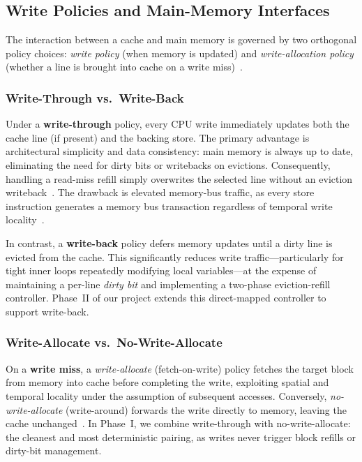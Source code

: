 %

\subsection{Write Policies and Main-Memory Interfaces}
\label{sec:litreview-m3}

The interaction between a cache and main memory is governed by two
orthogonal policy choices: \emph{write policy} (when memory is updated) and
\emph{write-allocation policy} (whether a line is brought into cache on a
write miss)~\cite{smith1982, hennessy2017}.

\subsubsection{Write-Through vs.\ Write-Back}
Under a \textbf{write-through} policy, every CPU write immediately updates
both the cache line (if present) and the backing store. The primary
advantage is architectural simplicity and data consistency: main memory is
always up to date, eliminating the need for dirty bits or writebacks on
evictions. Consequently, handling a read-miss refill simply overwrites the
selected line without an eviction writeback~\cite{jouppi1990}. The drawback
is elevated memory-bus traffic, as every store instruction generates a memory
bus transaction regardless of temporal write locality~\cite{patterson2020}.

In contrast, a \textbf{write-back} policy defers memory updates until a
dirty line is evicted from the cache. This significantly reduces write
traffic—particularly for tight inner loops repeatedly modifying local
variables—at the expense of maintaining a per-line \emph{dirty bit} and
implementing a two-phase eviction-refill controller. Phase~II of our project
extends this direct-mapped controller to support write-back.

\subsubsection{Write-Allocate vs.\ No-Write-Allocate}
On a \textbf{write miss}, a \emph{write-allocate} (fetch-on-write) policy
fetches the target block from memory into cache before completing the write,
exploiting spatial and temporal locality under the assumption of subsequent
accesses. Conversely, \emph{no-write-allocate} (write-around) forwards the
write directly to memory, leaving the cache unchanged~\cite{hennessy2017, hill1989}.
In Phase~I, we combine write-through with no-write-allocate: the cleanest and
most deterministic pairing, as writes never trigger block refills or dirty-bit
management.

